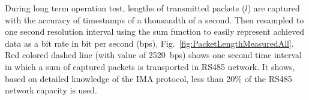 During long term operation test, lengths of transmitted packets ($ l $) are captured with the accuracy of timestamps of a thousandth of a second. Then resampled to one second resolution interval using the sum function to easily represent achieved data as a bit rate in bit per second (bps),
Fig.~\ref{fig:PacketLengthMeasuredAll}.
Red colored dashed line (with value of 2520~bps) shows one second time interval in which a sum of captured packets is transported in RS485 network. It shows, based on detailed knowledge of the IMA protocol, less than 20\% of the RS485 network capacity is used. 








